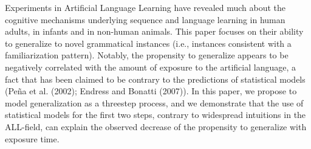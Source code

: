 Experiments in Artificial Language Learning have revealed much about the cognitive mechanisms underlying sequence and language learning in human adults, in infants and in non-human animals. This paper focuses on their ability to generalize to novel grammatical instances (i.e., instances consistent with a familiarization pattern). Notably, the propensity to generalize appears to be negatively correlated with the amount of exposure to the artificial language, a fact that has been claimed to be contrary to the predictions of statistical models (Peña et al. (2002); Endress and Bonatti (2007)). In this paper, we propose to model generalization as a threestep process, and we demonstrate that the use of statistical models for the first two steps, contrary to widespread intuitions in the ALL-field, can explain the observed decrease of the propensity to generalize with exposure time.
